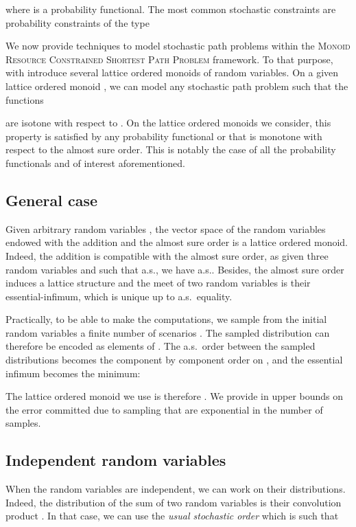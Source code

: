 \documentclass[11pt]{amsart}
\theoremstyle{plain}
\theoremstyle{remark}
\newcommand{\MRCSP}{\textsc{Monoid Resource Constrained Shortest Path Problem}\xspace}
\begin{document}
where  is a probability functional. The most common stochastic constraints are probability constraints of the type 


We now provide techniques to model stochastic path problems within the \MRCSP framework. To that purpose, with introduce several lattice ordered monoids of random variables. On a given lattice ordered monoid , we can model any stochastic path problem such that the functions
 
are isotone with respect to . On the lattice ordered monoids we consider, this property is satisfied by any probability functional  or  that is monotone with respect to the almost sure order. This is notably the case of all the probability functionals  and  of interest aforementioned.






\subsection{General case} \label{sub:general_case}
Given arbitrary random variables , the vector space of the random variables  endowed with the addition and the almost sure order is a lattice ordered monoid. Indeed, the addition is compatible with the almost sure order, as given three random variables  and  such that  a.s., we have  a.s.. Besides, the almost sure order induces a lattice structure and the meet of two random variables is their essential-infimum, which is unique up to a.s.~equality.

Practically, to be able to make the computations, we sample from the initial random variables a finite number  of scenarios . The sampled distribution can therefore be encoded as elements of . The a.s.~order between the sampled distributions becomes the component by component order on , and the essential infimum becomes the minimum:

The lattice ordered monoid we use is therefore . We provide in \cite{parmentier2016thesis} upper bounds on the error committed due to sampling that are exponential in the number of samples.

\subsection{Independent random variables} \label{sub:independent_random_variables}

When the random variables  are independent, we can work on their distributions. Indeed, the distribution of the sum of two random variables is their convolution product . In that case, we can use the \emph{usual stochastic order}  which is such that
 
\end{document}
